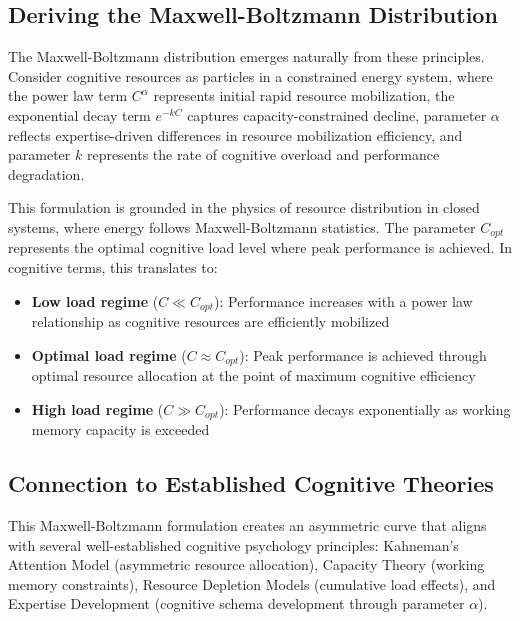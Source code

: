 \documentclass{article}
\begin{document}
\subsection*{Deriving the Maxwell-Boltzmann Distribution}

The Maxwell-Boltzmann distribution emerges naturally from these principles. Consider cognitive resources as particles 
in a constrained energy system, where the power law term $C^{\alpha}$ represents initial rapid resource 
mobilization, the exponential decay term $e^{-kC}$ captures capacity-constrained decline, parameter 
$\alpha$ reflects expertise-driven differences in resource mobilization efficiency, and parameter $k$ represents the 
rate of cognitive overload and performance degradation.

This formulation is grounded in the physics of resource distribution in closed systems, where energy follows 
Maxwell-Boltzmann statistics. The parameter $C_{opt}$ represents the optimal cognitive load level where peak 
performance is achieved. In cognitive terms, this translates to:

\begin{itemize}
    \item \textbf{Low load regime} ($C \ll C_{opt}$): Performance increases with a power law relationship as cognitive 
    resources are efficiently mobilized
    
    \item \textbf{Optimal load regime} ($C \approx C_{opt}$): Peak performance is achieved through optimal 
    resource allocation at the point of maximum cognitive efficiency
    
    \item \textbf{High load regime} ($C \gg C_{opt}$): Performance decays exponentially as working memory 
    capacity is exceeded
\end{itemize}

\subsection*{Connection to Established Cognitive Theories}

This Maxwell-Boltzmann formulation creates an asymmetric curve that aligns with several well-established cognitive
psychology principles: Kahneman's Attention Model (asymmetric resource allocation), Capacity Theory (working memory
constraints), Resource Depletion Models (cumulative load effects), and Expertise Development (cognitive schema
development through parameter $\alpha$).
\end{document}
